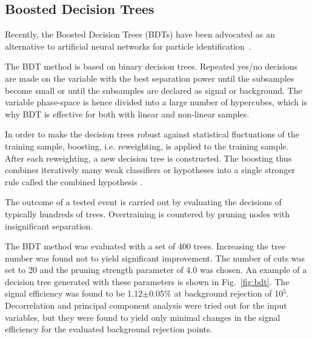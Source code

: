 \documentclass[a4paper]{jpconf}
\begin{document}




\subsection{Boosted Decision Trees}
Recently, the Boosted Decision Trees (BDTs) have been advocated as an alternative to 
artificial neural networks for particle identification~\cite{bdt}.

The BDT method is based on binary decision trees. 
Repeated yes/no decisions are made on the variable with the
best separation power until the subsamples become small or until the
subsamples are declared as signal or background. The variable
phase-space is hence divided into a large number of hypercubes, which is
why BDT is effective for both with linear and non-linear
samples.

In order to make the decision trees robust against statistical
fluctuations of the training sample, boosting, i.e. reweighting, is
applied to the training sample. After each reweighting, a new decision
tree is constructed. 
The boosting thus combines iteratively many weak classifiers or hypotheses 
into a single stronger rule called the combined hypothesis \cite{bdt}.

The outcome of a tested event is carried out
by evaluating the decisions of typically hundreds of
trees. Overtraining is countered by pruning nodes with insignificant
separation. 


The BDT method was evaluated with a set of 400 trees. Increasing the
tree number was found not to yield significant improvement. The number
of cuts was set to 20 and the pruning strength
parameter of 4.0 was chosen. An example of a decision tree generated
with these parameters is shown in Fig.~\ref{fig:bdt}. The signal efficiency was
found to be 1.12$\pm$0.05\% at background rejection of 10$^5$.
Decorrelation and principal component analysis were tried out for the
input variables, but they were found to yield only minimal changes in
the signal efficiency for the evaluated background rejection points.
\end{document}
